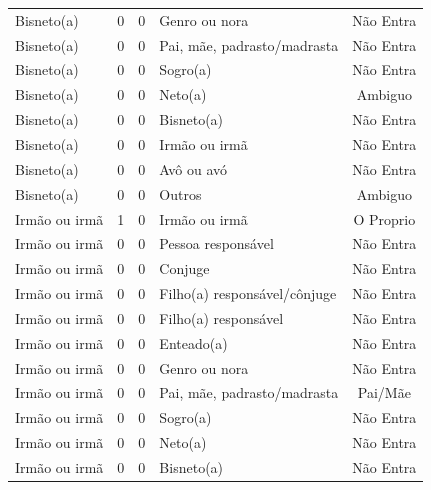 \documentclass[
	12pt,				%
	openright,			%
	twoside,			%
	a4paper,			%
	english,			%
	french,				%
	spanish,			%
	brazil				%
	]{abntex2}
\begin{document}
\begin{anexosenv}
\begin{longtable}{@{}lcclc@{}}
Bisneto(a)                   & 0         & 0        & Genro ou nora                & Não Entra       \\
Bisneto(a)                   & 0         & 0        & Pai, mãe, padrasto/madrasta  & Não Entra       \\
Bisneto(a)                   & 0         & 0        & Sogro(a)                     & Não Entra       \\
Bisneto(a)                   & 0         & 0        & Neto(a)                      & Ambiguo         \\
Bisneto(a)                   & 0         & 0        & Bisneto(a)                   & Não Entra       \\
Bisneto(a)                   & 0         & 0        & Irmão ou irmã                & Não Entra       \\
Bisneto(a)                   & 0         & 0        & Avô ou avó                   & Não Entra       \\
Bisneto(a)                   & 0         & 0        & Outros                       & Ambiguo         \\
Irmão ou irmã                & 1         & 0        & Irmão ou irmã                & O Proprio       \\
Irmão ou irmã                & 0         & 0        & Pessoa responsável           & Não Entra       \\
Irmão ou irmã                & 0         & 0        & Conjuge                      & Não Entra       \\
Irmão ou irmã                & 0         & 0        & Filho(a) responsável/cônjuge & Não Entra       \\
Irmão ou irmã                & 0         & 0        & Filho(a) responsável         & Não Entra       \\
Irmão ou irmã                & 0         & 0        & Enteado(a)                   & Não Entra       \\
Irmão ou irmã                & 0         & 0        & Genro ou nora                & Não Entra       \\
Irmão ou irmã                & 0         & 0        & Pai, mãe, padrasto/madrasta  & Pai/Mãe         \\
Irmão ou irmã                & 0         & 0        & Sogro(a)                     & Não Entra       \\
Irmão ou irmã                & 0         & 0        & Neto(a)                      & Não Entra       \\
Irmão ou irmã                & 0         & 0        & Bisneto(a)                   & Não Entra       \\

\end{longtable}
\end{anexosenv}
\end{document}
